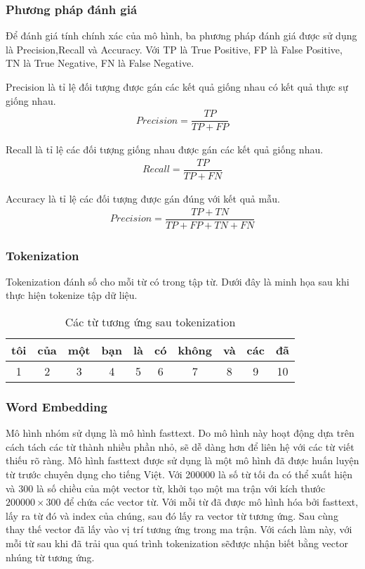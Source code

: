 \subsubsection{Phương pháp đánh giá}
Để đánh giá tính chính xác của mô hình, ba phương pháp đánh giá được sử dụng là Precision,Recall và Accuracy. Với TP là True Positive, FP là False Positive, TN là True Negative, FN là False Negative.

Precision là tỉ lệ đối tượng được gán các kết quả giống nhau có kết quả thực sự giống nhau.
\begin{align}
    Precision=\dfrac{TP}{TP+FP}
\end{align}

Recall là tỉ lệ các đối tượng giống nhau được gán các kết quả giống nhau.
\begin{align}
    Recall=\dfrac{TP}{TP+FN}
\end{align}

Accuracy là tỉ lệ các đối tượng được gán đúng với kết quả mẫu.
\begin{align}
    Precision=\dfrac{TP+TN}{TP+FP+TN+FN}
\end{align}

\subsubsection{Tokenization}
Tokenization đánh số cho mỗi từ có trong tập từ. Dưới đây là minh họa sau khi thực hiện tokenize
tập dữ liệu.
\begin{table}
    \centering
    \caption{Các từ tương ứng sau tokenization}
    \begin{tabularx}{0.95\textwidth}{C{1}|C{1}|C{1}|C{1}|C{1}|C{1}|C{1}|C{1}|C{1}|C{1}}
        \toprule
        tôi & của & một & bạn & là & có & không & và & các & đã \\   & 2   & 3   & 4   & 5  & 6  & 7     & 8  & 9   & 10 \\
        \bottomrule
    \end{tabularx}
\end{table}

\subsubsection{Word Embedding}
Mô hình nhóm sử dụng là mô hình fasttext. Do mô hình này hoạt động dựa trên cách tách các từ thành nhiều phần nhỏ, sẽ dễ dàng hơn để liên hệ với các từ viết thiếu rõ ràng. Mô hình fasttext được sử dụng là một mô hình đã được huấn luyện từ trước chuyên dụng cho tiếng Việt. Với 200000 là số từ tối đa có thể xuất hiện và 300 là số chiều của một vector từ, khởi tạo một ma trận với kích thước $200000\times300$ để chứa các vector từ. Với mỗi từ đã được mô hình hóa bởi fasttext, lấy ra từ đó và index của chúng, sau đó lấy ra vector từ tương ứng. Sau cùng thay thế vector đã lấy vào vị trí tương ứng trong ma trận. Với cách làm này, với mỗi từ sau khi đã trải qua quá trình tokenization sẽđược nhận biết bằng vector nhúng từ tương ứng.